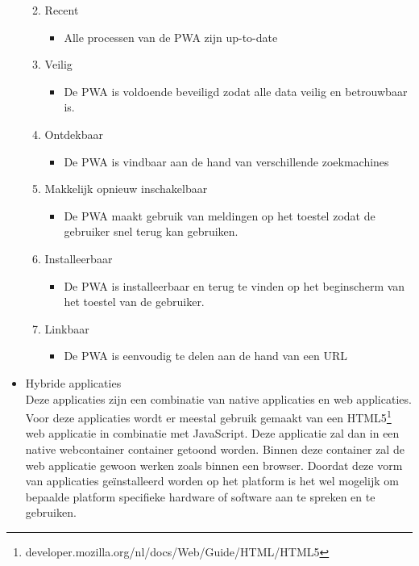 \begin{itemize}
\begin{enumerate}
\begin{itemize}
       \end{itemize}
       \item Recent
       \begin{itemize}
           \item Alle processen van de PWA zijn up-to-date 
       \end{itemize}
       \item Veilig
       \begin{itemize}
           \item De PWA is voldoende beveiligd zodat alle data veilig en betrouwbaar is.
       \end{itemize}
       \item Ontdekbaar
       \begin{itemize}
           \item De PWA is vindbaar aan de hand van verschillende zoekmachines
       \end{itemize}
       \item Makkelijk opnieuw inschakelbaar
       \begin{itemize}
           \item De PWA maakt gebruik van meldingen op het toestel zodat de gebruiker snel terug kan gebruiken.
       \end{itemize}
       \item Installeerbaar
       \begin{itemize}
           \item De PWA is installeerbaar en terug te vinden op het beginscherm van het toestel van de gebruiker.
       \end{itemize}
       \item Linkbaar
       \begin{itemize}
           \item De PWA is eenvoudig te delen aan de hand van een URL
       \end{itemize}
    \end{enumerate} 

    \item Hybride applicaties\\
    Deze applicaties zijn een combinatie van native applicaties en web applicaties. Voor deze applicaties wordt er meestal gebruik gemaakt van een HTML5\footnote{developer.mozilla.org/nl/docs/Web/Guide/HTML/HTML5} web applicatie in combinatie met JavaScript. Deze applicatie zal dan in een native webcontainer container getoond worden. Binnen deze container zal de web applicatie gewoon werken zoals binnen een browser. Doordat deze vorm van applicaties geïnstalleerd worden op het platform is het wel mogelijk om bepaalde platform specifieke hardware of software aan te spreken en te gebruiken.
    \\
    

\end{itemize}
